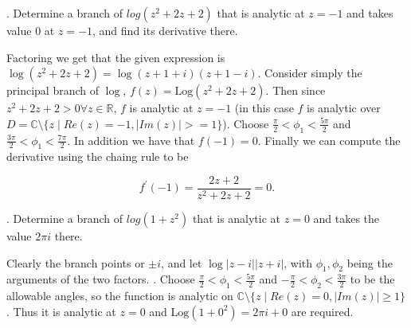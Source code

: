 \documentclass[letterpaper, reqno,11pt]{article}
\begin{document}
\medskip

. Determine a branch of $ log (z^2+2z+2)$ that is analytic at $z=-1$ and takes value $ 0$ at $z=-1$, and find its derivative there.

Factoring we get that the given expression is $ \log(z^2+2z+2)=\log(z+1+i)(z+1-i)$. Consider simply the principal branch of $\log$, $f(z)=\text{Log}(z^2+2z+2)$. Then since $z^2+2z+2>0\forall z\in\mathbb{R}$, $f$ is analytic at  $z=-1$ (in this case $f$ is analytic over $D=\mathbb{C}\setminus\{z\mid Re(z)=-1, |Im(z)|>=1\} $). Choose $\frac{\pi}{2}<\phi_1<\frac{5\pi}{2}$ and $\frac{3\pi}{2}<\phi_1<\frac{7\pi}{2}$. In addition we have that $f(-1)=0$. Finally we can compute the derivative using the chaing rule to be

\[
f^\prime(-1)=\frac{2z+2}{z^2+2z+2}=0
.\]


\medskip

. Determine a branch of $log (1+z^2)$ that is analytic at $z=0$ and takes the value $2 \pi i$ there.

Clearly the branch points or $\pm i$, and let $\log|z-i||z+i|$, with $\phi_1, \phi_2$ being the arguments of the two factors. . Choose $ \frac{\pi}{2}<\phi_1<\frac{5\pi}{2}$ and $-\frac{\pi}{2}<\phi_2<\frac{3\pi}{2}$ to be the allowable angles, so the function is analytic on $\mathbb{C}\setminus \{z\mid Re(z)=0, |Im(z)|\geq 1\} $. Thus it is analytic at $z=0$ and $\text{Log}(1+0^2)=2\pi i+0$ are required. 
\end{document}

